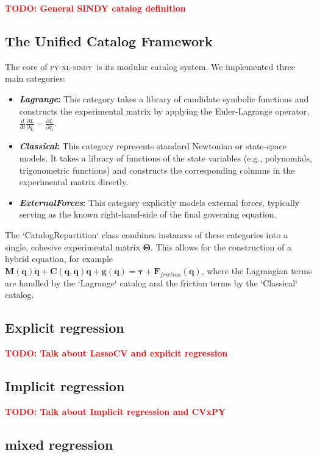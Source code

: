 \documentclass[12pt]{article}
\newcommand{\frameworkname}{\textsc{py-xl-sindy}}
\newcommand{\lagrangecat}{\textit{Lagrange}}
\newcommand{\classicalcat}{\textit{Classical}}
\newcommand{\forcescat}{\textit{ExternalForces}}
\newcommand{\TODO}[1]{\textbf{\textcolor{red}{\Large TODO: \normalsize #1}}}
\begin{document}
\TODO{General SINDY catalog definition}

\subsection*{The Unified Catalog Framework}

The core of \frameworkname\ is its modular catalog system. We implemented three main categories:
\begin{itemize}
    \item \textbf{\lagrangecat:} This category takes a library of candidate symbolic functions and constructs the experimental matrix by applying the Euler-Lagrange operator, $\frac{d}{dt}\frac{\partial L}{\partial \dot{q}_i} - \frac{\partial L}{\partial q_i}$.
    \item \textbf{\classicalcat:} This category represents standard Newtonian or state-space models. It takes a library of functions of the state variables (e.g., polynomials, trigonometric functions) and constructs the corresponding columns in the experimental matrix directly.
    \item \textbf{\forcescat:} This category explicitly models external forces, typically serving as the known right-hand-side of the final governing equation.
\end{itemize}
The `CatalogRepartition` class combines instances of these categories into a single, cohesive experimental matrix $\mathbf{\Theta}$. This allows for the construction of a hybrid equation, for example $\mathbf{M}(\mathbf{q})\ddot{\mathbf{q}} + \mathbf{C}(\mathbf{q},\dot{\mathbf{q}})\dot{\mathbf{q}} + \mathbf{g}(\mathbf{q}) = \mathbf{\tau} + \mathbf{F}_{friction}(\dot{\mathbf{q}})$, where the Lagrangian terms are handled by the `Lagrange` catalog and the friction terms by the `Classical` catalog.

\subsection*{Explicit regression}

\TODO{Talk about LassoCV and explicit regression}

\subsection*{Implicit regression}

\TODO{Talk about Implicit regression and CVxPY}

\subsection*{mixed regression}
\end{document}

